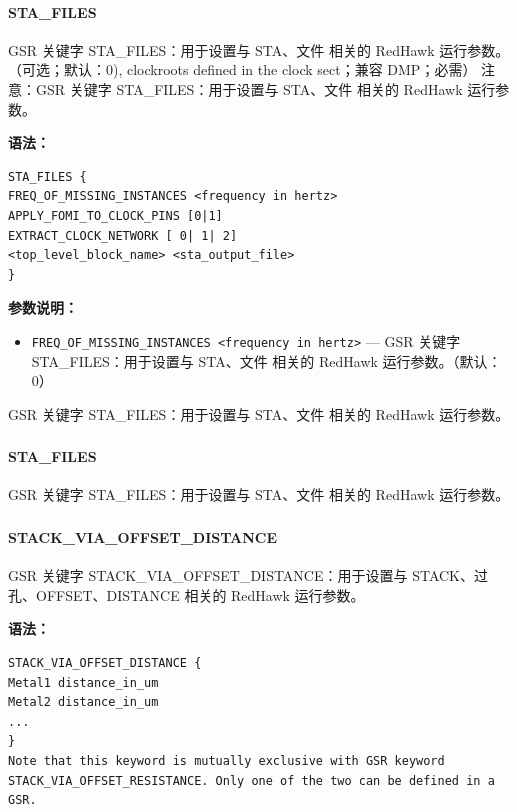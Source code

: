 \paragraph*{STA_FILES}

GSR 关键字 STA_FILES：用于设置与 STA、文件 相关的 RedHawk 运行参数。（可选；默认：0), clockroots defined in the clock sect；兼容 DMP；必需） 注意：GSR 关键字 STA_FILES：用于设置与 STA、文件 相关的 RedHawk 运行参数。

\textbf{语法：}
\begin{lstlisting}
STA_FILES {
FREQ_OF_MISSING_INSTANCES <frequency in hertz>
APPLY_FOMI_TO_CLOCK_PINS [0|1]
EXTRACT_CLOCK_NETWORK [ 0| 1| 2]
<top_level_block_name> <sta_output_file>
}
\end{lstlisting}

\textbf{参数说明：}
\begin{itemize}
\item \texttt{FREQ\_OF\_MISSING\_INSTANCES <frequency in hertz>} — GSR 关键字 STA\_FILES：用于设置与 STA、文件 相关的 RedHawk 运行参数。（默认：0）
\end{itemize}

\begin{noteBox}
GSR 关键字 STA\_FILES：用于设置与 STA、文件 相关的 RedHawk 运行参数。
\end{noteBox}

\subsubsection{}
\paragraph*{STA_FILES}

GSR 关键字 STA_FILES：用于设置与 STA、文件 相关的 RedHawk 运行参数。

\subsubsection{}
\paragraph*{STACK_VIA_OFFSET_DISTANCE}

GSR 关键字 STACK_VIA_OFFSET_DISTANCE：用于设置与 STACK、过孔、OFFSET、DISTANCE 相关的 RedHawk 运行参数。

\textbf{语法：}
\begin{lstlisting}
STACK_VIA_OFFSET_DISTANCE {
Metal1 distance_in_um
Metal2 distance_in_um
...
}
Note that this keyword is mutually exclusive with GSR keyword
STACK_VIA_OFFSET_RESISTANCE. Only one of the two can be defined in a
GSR.
\end{lstlisting}

